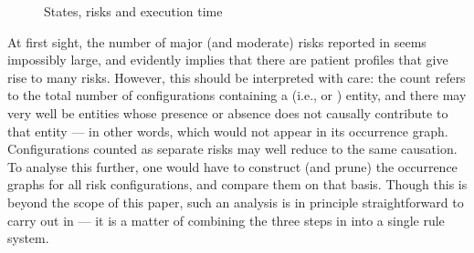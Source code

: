 \begin{figure}\centering
{}

\caption{States, risks and execution time}
\label{tab:cmsb-experiments}
\end{figure}

At first sight, the number of major (and moderate) risks reported in  seems impossibly large, and evidently implies that there are patient profiles that give rise to many risks. However, this should be interpreted with care: the count refers to the total number of configurations containing a \Forbidden (i.e., \major or \minor) entity, and there may very well be entities whose presence or absence does not causally contribute to that \Forbidden entity --- in other words, which would not appear in its occurrence graph. Configurations counted as separate risks may well reduce to the same causation. To analyse this further, one would have to construct (and prune) the occurrence graphs for all risk configurations, and compare them on that basis. Though this is beyond the scope of this paper, such an analysis is in principle straightforward to carry out in \GROOVE --- it is a matter of combining the three steps in  into a single rule system.

